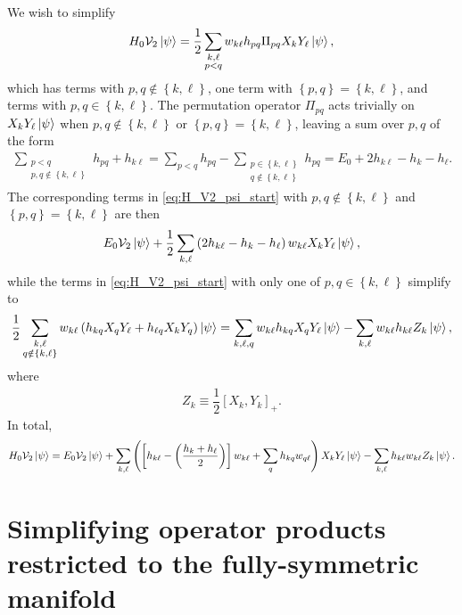 \documentclass[nofootinbib,notitlepage,11pt]{revtex4-2}
\newcommand{\f}[2]{\dfrac{#1}{#2}} %
\newcommand{\p}[1]{\left(#1\right)} %
\renewcommand{\sp}[1]{\left[#1\right]} %
\renewcommand{\set}[1]{\left\{#1\right\}} %
\newcommand{\1}{\mathds{1}}
\newcommand{\V}{\mathcal{V}}
\begin{document}
We wish to simplify
\begin{align}
  H_0 \V_2 \ket\psi
  = \f12 \sum_{\substack{k,\ell\\p<q}} w_{k\ell} h_{pq}
  \Pi_{pq} X_k Y_\ell \ket\psi,
  \label{eq:H_V2_psi_start}
\end{align}
which has terms with $p,q\notin\set{k,\ell}$, one term with
$\set{p,q}=\set{k,\ell}$, and terms with $p,q\in\set{k,\ell}$.  The
permutation operator $\Pi_{pq}$ acts trivially on
$X_k Y_\ell \ket\psi$ when $p,q\notin\set{k,\ell}$ or
$\set{p,q}=\set{k,\ell}$, leaving a sum over $p,q$ of the form
\begin{align}
  \sum_{\substack{p<q\\p,q\notin\set{k,\ell}}} h_{pq} + h_{k\ell}
  = \sum_{p<q} h_{pq}
  - \sum_{\substack{p\in\set{k,\ell}\\q\notin\set{k,\ell}}} h_{pq}
  = E_0 + 2 h_{k\ell} - h_k - h_\ell.
\end{align}
The corresponding terms in \eqref{eq:H_V2_psi_start} with
$p,q\notin\set{k,\ell}$ and $\set{p,q}=\set{k,\ell}$ are then
\begin{align}
  E_0 \V_2 \ket\psi + \f12 \sum_{k,\ell}
  \p{2 h_{k\ell} - h_k - h_\ell}
  w_{k\ell} X_k Y_\ell \ket\psi,
\end{align}
while the terms in \eqref{eq:H_V2_psi_start} with only one of
$p,q\in\set{k,\ell}$ simplify to
\begin{align}
  \f12 \sum_{\substack{k,\ell\\q\notin\set{k,\ell}}} w_{k\ell}
  \p{h_{kq} X_q Y_\ell + h_{\ell q} X_k Y_q} \ket\psi
  = \sum_{k,\ell,q} w_{k\ell} h_{kq} X_q Y_\ell \ket\psi
  - \sum_{k,\ell} w_{k\ell} h_{k\ell} Z_k \ket\psi,
\end{align}
where
\begin{align}
  Z_k \equiv \f12 \sp{X_k, Y_k}_+.
\end{align}
In total,
\begin{align}
  H_0 \V_2 \ket\psi
  = E_0 \V_2 \ket\psi
  + \sum_{k,\ell} \p{\sp{h_{k\ell}-\p{\f{h_k+h_\ell}{2}}} w_{k\ell}
    + \sum_q h_{kq} w_{q\ell}} X_k Y_\ell \ket\psi
  - \sum_{k,\ell} h_{k\ell} w_{k\ell} Z_k \ket\psi.
\end{align}


\section{Simplifying operator products restricted to the
  fully-symmetric manifold}
\end{document}
